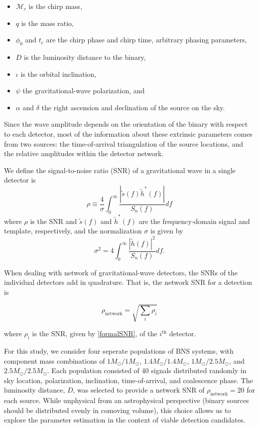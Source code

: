 \documentclass[11pt,a4paper]{emulateapj}
\begin{document}
\begin{itemize}
\item $\mathcal{M}_c$ is the chirp mass,
\item $q$ is the mass ratio,
\item $\phi_0$ and $t_c$ are the chirp phase and chirp time, arbitrary phasing parameters,
\item $D$ is the luminosity distance to the binary,
\item $\iota$ is the orbital inclination, 
\item $\psi$ the gravitational-wave polarization, and
\item $\alpha$ and $\delta$ the right ascension and declination of the
source on the sky.
\end{itemize}
  Since the wave amplitude depends on the orientation of the
binary with respect to each detector, most of the information about these extrinsic
parameters comes from two sources: the time-of-arrival triangulation of 
the source locations, and the relative amplitudes within the detector network.

We define the signal-to-noise ratio (SNR) of a gravitational wave in a
single detector is
\begin{equation}
  \rho \equiv \frac{4}{\sigma} \int^{\infty}_{0}\frac{| \tilde{s}(f)\tilde{h}^{*}(f)|}{S_{n}(f)}df
  \label{formalSNR}
\end{equation}
where $\rho$ is the SNR and $\tilde s(f)$ and $\tilde{h}^{*}(f)$ are
the frequency-domain signal and template, respectively, and the normalization $\sigma$ is
given by
\begin{equation}
  \sigma^2 = 4\int^{\infty}_{0}\frac{| \tilde{h}(f)|^2}{S_n(f)}df.
  \label{SNRnorm}
\end{equation}

When dealing with network of gravitational-wave detectors, the SNRs of the individual detectors add in quadrature.  That is, the network SNR for a detection is

\begin{equation}
\rho_{\text{network}} = \sqrt{\sum_i \rho_{i}}
\label{SNRnetwork}
\end{equation}

\noindent where $\rho_i$ is the SNR, given by \eqref{formalSNR}, of the $i^{\text{th}}$ detector.

For this study, we consider four seperate populations of BNS systems, with component mass 
combinations of $1M_{\odot}/1M_{\odot}$, $1.4M_{\odot}/1.4M_{\odot}$, $1M_{\odot}/2.5M_{\odot}$, 
and $2.5M_{\odot}/2.5M_{\odot}$.  Each population consisted of 40 signals distributed randomly
in sky location, polarization, inclination, time-of-arrival, and coalescence phase.  The luminosity 
distance, $D$, was selected to provide a network SNR of $\rho_{\text{network}}=20$ for each source.
While unphysical from an astrophysical perspective (binary sources should be 
distributed evenly in comoving volume), this choice allows us to explore the parameter estimation
in the context of viable detection candidates. 
\end{document}
